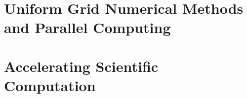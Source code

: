 \documentclass[%
    twoside, openright, titlepage, numbers=noenddot,%
    cleardoublepage=plain,%
    abstractoff,
    BCOR=5.5mm, paper=a4, fontsize=11pt,%
]{scrreprt}
\begin{document}
\frenchspacing
\raggedbottom%
\pagestyle{scrplain}

%
%
%
%
\cleardoublepage\setcounter{page}{1}

%
%




\cleardoublepage
\cleardoublepage
\cleardoublepage
\pagestyle{headings}
\cleardoublepage

%
%

\cleardoublepage
\part{Uniform Grid Numerical Methods and Parallel Computing}
%
%
\cleardoublepage%

\cleardoublepage

\cleardoublepage

\cleardoublepage
%
\cleardoublepage
\part{Accelerating Scientific Computation}
\cleardoublepage
%

\cleardoublepage

\cleardoublepage

\cleardoublepage

\cleardoublepage
%
\cleardoublepage

\cleardoublepage
%
\cleardoublepage

\appendix
\cleardoublepage%
%

\cleardoublepage%

\cleardoublepage
\cleardoublepage%
\cleardoublepage
{}
\end{document}
